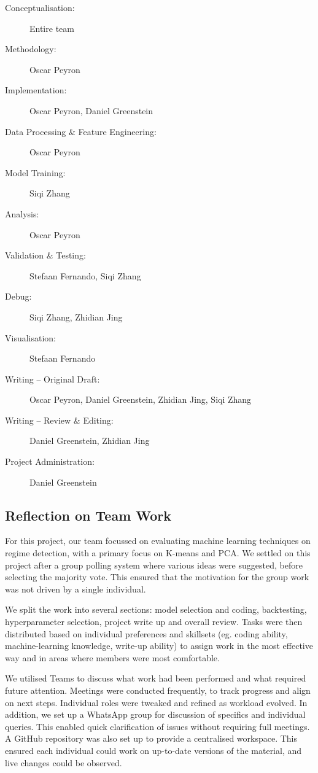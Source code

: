 \documentclass[11pt, a4paper]{article}
\begin{document}
\begin{description}
    \item[Conceptualisation:]Entire team
    \item[Methodology:] Oscar Peyron
    \item[Implementation:] Oscar Peyron, Daniel Greenstein
    \item[Data Processing \& Feature Engineering:]  Oscar Peyron
    \item[Model Training:] Siqi Zhang
    \item[Analysis:] Oscar Peyron
    \item[Validation \& Testing:] Stefaan Fernando, Siqi Zhang
    \item[Debug:] Siqi Zhang, Zhidian Jing
    \item[Visualisation:]Stefaan Fernando
    \item[Writing -- Original Draft:] Oscar Peyron, Daniel Greenstein, Zhidian Jing, Siqi Zhang
    \item[Writing -- Review \& Editing:]Daniel Greenstein, Zhidian Jing
    \item[Project Administration:]Daniel Greenstein

\end{description}

\subsection{Reflection on Team Work}
For this project, our team focussed on evaluating machine learning techniques on regime detection, with a primary focus on K-means and PCA. We settled on this project after a group polling system where various ideas were suggested, before selecting the majority vote. This ensured that the motivation for the group work  was not driven by a single individual.

We split the work into several sections: model selection and coding, backtesting, hyperparameter selection, project write up and overall review. Tasks were then distributed based on individual preferences and skillsets (eg. coding ability, machine-learning knowledge, write-up ability) to assign work in the most effective way and in areas where members were most comfortable.

We utilised Teams to discuss what work had been performed and what required future attention. Meetings were conducted frequently, to track progress and align on next steps. Individual roles were tweaked and refined as workload evolved.
In addition, we set up a WhatsApp group for discussion of specifics and individual queries. This enabled quick clarification of issues without requiring full meetings. A GitHub repository was also set up to provide a centralised workspace. This ensured each individual could work on up-to-date versions of the material, and live changes could be observed.
\end{document}
